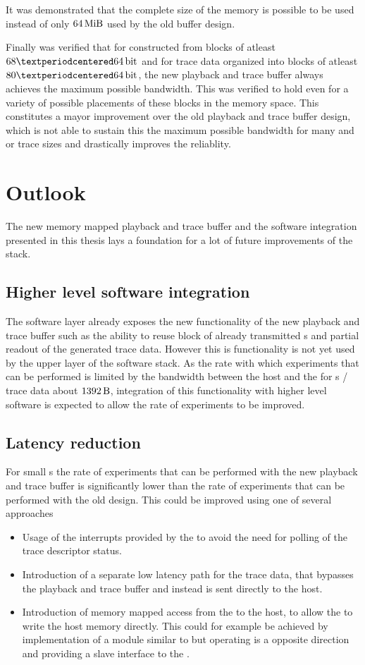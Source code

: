 It was demonstrated that the complete size of the \DDR{} memory is possible to be used instead of only $\SI{64}{\mebi\byte}$ used by the old buffer design.

Finally was verified that for \PlaybackProgram{} constructed from blocks of atleast $\num{68}·\PhyWordSize{}$ and for trace data organized into blocks of atleast $\num{80}·\PhyWordSize{}$, the new playback and trace buffer always achieves the maximum possible bandwidth. This was verified to hold even for a variety of possible placements of these blocks in the \DDR{} memory space.
This constitutes a mayor improvement over the old playback and trace buffer design, which is not able to sustain this the maximum possible bandwidth for many \PlaybackProgram{} and or trace sizes and drastically improves the reliablity.

\section{Outlook}
The new memory mapped playback and trace buffer and the software integration presented in this thesis lays a foundation for a lot of future improvements of the \BSS{} stack.
\subsection{Higher level software integration}
The \ayo{} software layer already exposes the new functionality of the new playback and trace buffer such as the ability to reuse block of already transmitted \PlaybackProgram{}s and partial readout of the generated trace data. However this is functionality is not yet used by the upper layer of the \BSS{} software stack. As the rate with which experiments that can be performed is limited by the bandwidth between the host and the \FPGA{} for \PlaybackProgram{}s / trace data about $\SI{1392}{\byte}$, integration of this functionality with higher level software is expected to allow the rate of experiments to be improved.
\subsection{Latency reduction}
For small \PlaybackProgram{}s the rate of experiments that can be performed with the new playback and trace buffer is significantly lower than the rate of experiments that can be performed with the old design. This could be improved using one of several approaches
\begin{itemize}
\item Usage of the interrupts provided by the \AXIDMA{} to avoid the need for polling of the trace descriptor status.
\item Introduction of a separate low latency path for the trace data, that bypasses the playback and trace buffer and instead is sent directly to the host.
\item Introduction of memory mapped access from the \FPGA{} to the host, to allow the \FPGA{} to write the host memory directly. This could for example be achieved by implementation of a module similar to \FAXI{} but operating is a opposite direction and providing a \AXI{} slave interface to the \FPGA{}.
\end{itemize}

